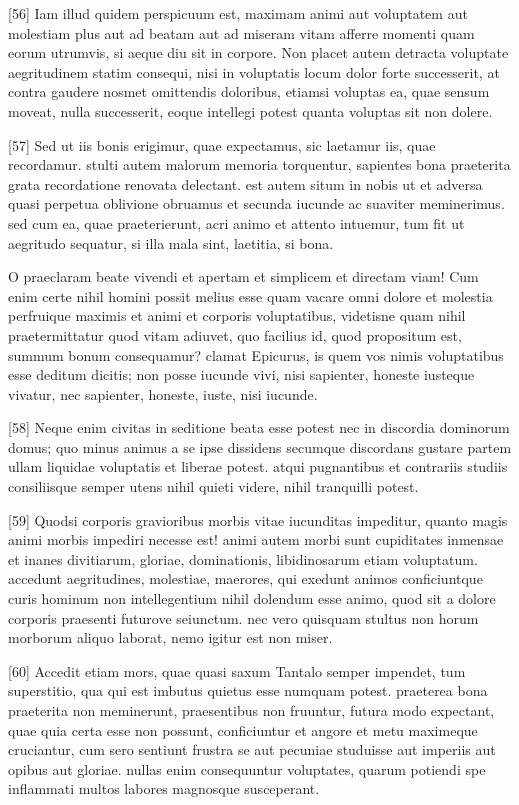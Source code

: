 \documentclass{article}
\begin{document}
[56] Iam illud quidem perspicuum est, maximam animi aut voluptatem aut molestiam plus aut ad beatam aut ad miseram vitam afferre momenti quam eorum utrumvis, si aeque diu sit in corpore. Non placet autem detracta voluptate aegritudinem statim consequi, nisi in voluptatis locum dolor forte successerit, at contra gaudere nosmet omittendis doloribus, etiamsi voluptas ea, quae sensum moveat, nulla successerit, eoque intellegi potest quanta voluptas sit non dolere.

[57] Sed ut iis bonis erigimur, quae expectamus, sic laetamur iis, quae recordamur. stulti autem malorum memoria torquentur, sapientes bona praeterita grata recordatione renovata delectant. est autem situm in nobis ut et adversa quasi perpetua oblivione obruamus et secunda iucunde ac suaviter meminerimus. sed cum ea, quae praeterierunt, acri animo et attento intuemur, tum fit ut aegritudo sequatur, si illa mala sint, laetitia, si bona.

O praeclaram beate vivendi et apertam et simplicem et directam viam! Cum enim certe nihil homini possit melius esse quam vacare omni dolore et molestia perfruique maximis et animi et corporis voluptatibus, videtisne quam nihil praetermittatur quod vitam adiuvet, quo facilius id, quod propositum est, summum bonum consequamur? clamat Epicurus, is quem vos nimis voluptatibus esse deditum dicitis; non posse iucunde vivi, nisi sapienter, honeste iusteque vivatur, nec sapienter, honeste, iuste, nisi iucunde.

[58] Neque enim civitas in seditione beata esse potest nec in discordia dominorum domus; quo minus animus a se ipse dissidens secumque discordans gustare partem ullam liquidae voluptatis et liberae potest. atqui pugnantibus et contrariis studiis consiliisque semper utens nihil quieti videre, nihil tranquilli potest.

[59] Quodsi corporis gravioribus morbis vitae iucunditas impeditur, quanto magis animi morbis impediri necesse est! animi autem morbi sunt cupiditates inmensae et inanes divitiarum, gloriae, dominationis, libidinosarum etiam voluptatum. accedunt aegritudines, molestiae, maerores, qui exedunt animos conficiuntque curis hominum non intellegentium nihil dolendum esse animo, quod sit a dolore corporis praesenti futurove seiunctum. nec vero quisquam stultus non horum morborum aliquo laborat, nemo igitur est non miser.

[60] Accedit etiam mors, quae quasi saxum Tantalo semper impendet, tum superstitio, qua qui est imbutus quietus esse numquam potest. praeterea bona praeterita non meminerunt, praesentibus non fruuntur, futura modo expectant, quae quia certa esse non possunt, conficiuntur et angore et metu maximeque cruciantur, cum sero sentiunt frustra se aut pecuniae studuisse aut imperiis aut opibus aut gloriae. nullas enim consequuntur voluptates, quarum potiendi spe inflammati multos labores magnosque susceperant.
\end{document}
